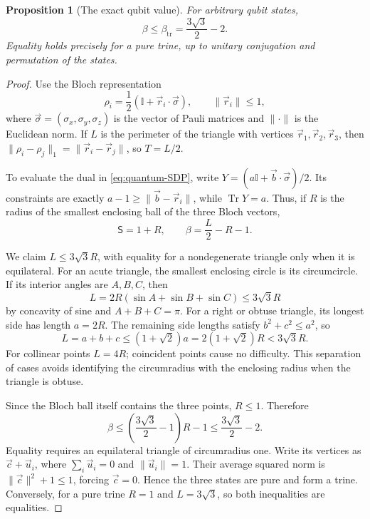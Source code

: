 \documentclass[a4paper,11pt,onecolumn,unpublished]{quantumarticle}
\newtheorem{proposition}[theorem]{Proposition}
\theoremstyle{definition}
\newcommand{\Tr}{\operatorname{Tr}}
\newcommand{\id}{\mathbb I}
\newcommand{\1}{\mathbf 1}
\newcommand{\Sopt}{\mathsf S}
\newcommand{\btr}{\beta_{\mathrm{tr}}}
\begin{document}
\begin{proposition}[The exact qubit value]\label{prop:qubit}
For arbitrary qubit states,
\begin{equation}\label{eq:qubit-bound}
 \beta\le\btr=\frac{3\sqrt3}{2}-2.
\end{equation}
Equality holds precisely for a pure trine, up to unitary conjugation and
permutation of the states.
\end{proposition}
\begin{proof}
Use the Bloch representation
\[
 \rho_i=\frac12(\id+\vec r_i\cdot\vec\sigma),\qquad
 \|\vec r_i\|\le1,
\]
where $\vec\sigma=(\sigma_x,\sigma_y,\sigma_z)$ is the vector of Pauli matrices
and $\|\cdot\|$ is the Euclidean norm. If $L$ is the perimeter of the triangle
with vertices $\vec r_1,\vec r_2,\vec r_3$, then
$\|\rho_i-\rho_j\|_1=\|\vec r_i-\vec r_j\|$, so $T=L/2$.

To evaluate the dual in \eqref{eq:quantum-SDP}, write
$Y=(a\id+\vec b\cdot\vec\sigma)/2$. Its constraints are exactly
$a-1\ge\|\vec b-\vec r_i\|$, while $\Tr Y=a$. Thus, if $R$ is the radius of
the smallest enclosing ball of the three Bloch vectors,
\begin{equation}\label{eq:qubit-geometry}
 \Sopt=1+R,\qquad\beta=\frac L2-R-1.
\end{equation}

We claim $L\le3\sqrt3R$, with equality for a nondegenerate triangle only when
it is equilateral. For an acute triangle, the smallest enclosing circle is its
circumcircle. If its interior angles are $A,B,C$, then
\[
 L=2R(\sin A+\sin B+\sin C)\le3\sqrt3R
\]
by concavity of sine and $A+B+C=\pi$. For a right or obtuse triangle, its longest
side has length $a=2R$. The remaining side lengths satisfy $b^2+c^2\le a^2$,
so
\[
 L=a+b+c\le(1+\sqrt2)a=2(1+\sqrt2)R<3\sqrt3R.
\]
For collinear points $L=4R$; coincident points cause no difficulty. This
separation of cases avoids identifying the circumradius with the enclosing
radius when the triangle is obtuse.

Since the Bloch ball itself contains the three points, $R\le1$. Therefore
\[
 \beta\le\left(\frac{3\sqrt3}{2}-1\right)R-1
 \le\frac{3\sqrt3}{2}-2.
\]
Equality requires an equilateral triangle of circumradius one. Write its
vertices as $\vec c+\vec u_i$, where $\sum_i\vec u_i=0$ and
$\|\vec u_i\|=1$. Their average squared norm is $\|\vec c\|^2+1\le1$,
forcing $\vec c=0$. Hence the three states are pure and form a trine.
Conversely, for a pure trine $R=1$ and $L=3\sqrt3$, so both inequalities
are equalities.
\end{proof}
\end{document}

